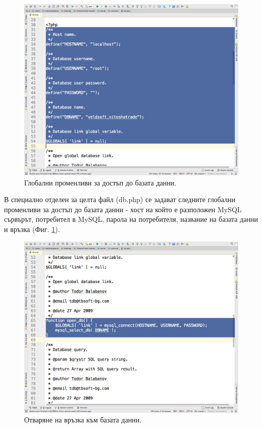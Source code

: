 \documentclass[book,14pt,oneside,openany]{memoir}
\begin{document}
\begin{figure}[h]
  \centering
  \includegraphics[height=0.45\pdfpageheight]{pic0111}
  \caption{Глобални променливи за достъп до базата данни.}
\label{fig:pic0111}
\end{figure}
\FloatBarrier

В специално отделен за целта файл (db.php) се задават следните глобални променливи за достъп до базата данни - хост на който е разположен MySQL сървърът, потребител в MySQL, парола на потребителя, название на базата данни и връзка (Фиг. \ref{fig:pic0111}).

\begin{figure}[h]
  \centering
  \includegraphics[height=0.45\pdfpageheight]{pic0112}
  \caption{Отваряне на връзка към базата данни.}
\label{fig:pic0112}
\end{figure}
\FloatBarrier
\end{document}
